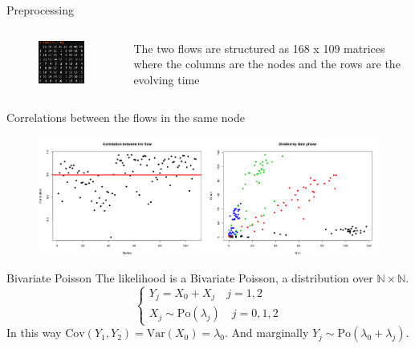 \documentclass{beamer}
\begin{document}
\begin{frame}{Preprocessing}
\begin{columns}
	\begin{column}{.5\linewidth}
		\begin{figure}[H]
			\centering
			\includegraphics[width=.8\linewidth]{pictures/ins_with_header.png} 
		\end{figure}
	\end{column}
	\begin{column}{.5\linewidth}
		The two flows are structured as 168 x 109 matrices where the columns are the nodes and the rows are the evolving time
	\end{column}
\end{columns}
\alert{Correlations} between the flows in the same node
\begin{figure}[H]
	\centering
	\includegraphics[width=1\linewidth]{pictures/correlation_pres.png} 
\end{figure}
\end{frame}

\begin{frame}{Bivariate Poisson}
The likelihood is a \alert{Bivariate Poisson}, a distribution over $\mathbb{N}\times\mathbb{N}$.
\begin{equation}
\begin{cases}
Y_j = X_0 + X_j \quad j = 1,2\\
X_j \sim \mathrm{Po}(\lambda_j) \quad j = 0,1,2
\end{cases}
\end{equation}
In this way $\mathrm{Cov}(Y_1, Y_2) = \mathrm{Var}(X_0) = \lambda_0$. And marginally $Y_j \sim \mathrm{Po}(\lambda_0 + \lambda_j)$.
\end{frame}
\end{document}
